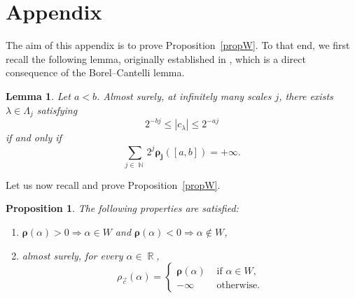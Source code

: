 \documentclass[a4paper,11pt,oneside]{article}
\DeclareMathOperator{\R}{\mathbb{R}}
\DeclareMathOperator{\N}{\mathbb{N}}
\newcommand{\ccint}[1]{\left[{#1}\right]}
\newcommand{\modu}[1]{\left\vert{#1}\right\vert}
\theoremstyle{definition}
\theoremstyle{plain}
\newtheorem{prop}[defi]{Proposition}
\newtheorem{lemma}[defi]{Lemma}
\begin{document}
\newpage
\appendix
\section{Appendix}
\label{appA}

The aim of this appendix is to prove Proposition~\ref{propW}. To that end, we first recall the following lemma, originally established in \cite{RWS}, which is a direct consequence of the Borel–Cantelli lemma.

\begin{lemma}\label{coeff_series}
Let $a<b$. Almost surely, at infinitely many scales $j$, there exists $\lambda\in\Lambda_j$ satisfying 
\[
2^{-bj}\leq \modu{c_\lambda}\leq 2^{-aj}
\]
if and only if
\[
\sum_{j\in\N}2^j\bm{\rho_j}(\ccint{a,b})=+\infty.
\]
\end{lemma}

\medskip

Let us now recall and prove Proposition~\ref{propW}.

\begin{prop}
The following properties are satisfied:
\begin{enumerate}
\item $\bm{\rho}(\alpha)>0\Rightarrow\alpha\in W$ and $\bm{\rho}(\alpha)<0\Rightarrow\alpha\notin W$,
\item almost surely, for every $\alpha\in\R$,
\[
\rho_{\vec{c}}(\alpha)=\left\{\begin{array}{ll}
\bm{\rho}(\alpha) & \text{ if }\alpha\in W, \\
-\infty & \text{ otherwise}.
\end{array}\right.
\]
\end{enumerate}
\end{prop}
\end{document}
